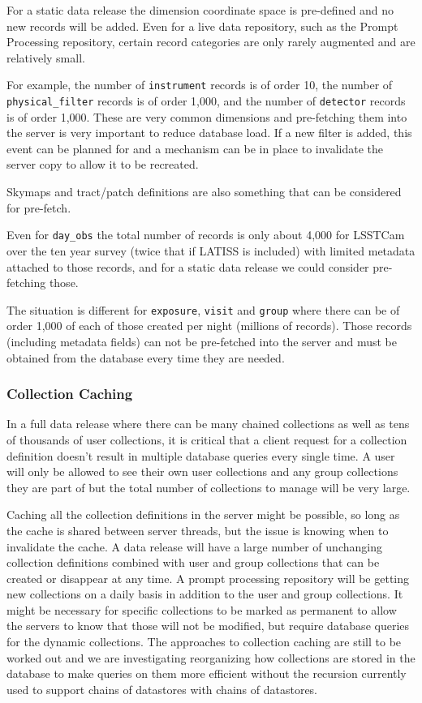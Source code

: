 For a static data release the dimension coordinate space is pre-defined and no new records will be added.
Even for a live data repository, such as the Prompt Processing repository, certain record categories are only rarely augmented and are relatively small.

For example, the number of \texttt{instrument} records is of order 10, the number of \texttt{physical\_filter} records is of order 1,000, and the number of \texttt{detector} records is of order 1,000.
These are very common dimensions and pre-fetching them into the server is very important to reduce database load.
If a new filter is added, this event can be planned for and a mechanism can be in place to invalidate the server copy to allow it to be recreated.

Skymaps and tract/patch definitions are also something that can be considered for pre-fetch.

Even for \texttt{day\_obs} the total number of records is only about 4,000 for LSSTCam over the ten year survey (twice that if LATISS is included) with limited metadata attached to those records, and for a static data release we could consider pre-fetching those.

The situation is different for \texttt{exposure}, \texttt{visit} and \texttt{group} where there can be of order 1,000 of each of those created per night (millions of records).
Those records (including metadata fields) can not be pre-fetched into the server and must be obtained from the database every time they are needed.

\subsubsection{Collection Caching}\label{collection-caching}

In a full data release where there can be many chained collections as well as tens of thousands of user collections, it is critical that a client request for a collection definition doesn't result in multiple database queries every single time.
A user will only be allowed to see their own user collections and any group collections they are part of but the total number of collections to manage will be very large.

Caching all the collection definitions in the server might be possible, so long as the cache is shared between server threads, but the issue is knowing when to invalidate the cache.
A data release will have a large number of unchanging collection definitions combined with user and group collections that can be created or disappear at any time.
A prompt processing repository will be getting new collections on a daily basis in addition to the user and group collections.
It might be necessary for specific collections to be marked as permanent to allow the servers to know that those will not be modified, but require database queries for the dynamic collections.
The approaches to collection caching are still to be worked out and we are investigating reorganizing how collections
are stored in the database to make queries on them more efficient without the recursion currently used to support chains of datastores with chains of datastores.

